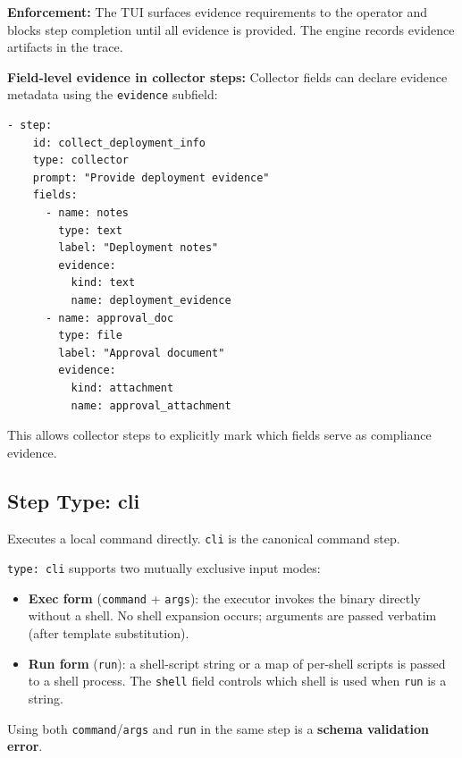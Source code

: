 \textbf{Enforcement:} The TUI surfaces evidence requirements to the operator and
blocks step completion until all evidence is provided.  The engine records evidence
artifacts in the trace.

\textbf{Field-level evidence in collector steps:}
Collector fields can declare evidence metadata using the \texttt{evidence} subfield:

\begin{verbatim}
- step:
    id: collect_deployment_info
    type: collector
    prompt: "Provide deployment evidence"
    fields:
      - name: notes
        type: text
        label: "Deployment notes"
        evidence:
          kind: text
          name: deployment_evidence
      - name: approval_doc
        type: file
        label: "Approval document"
        evidence:
          kind: attachment
          name: approval_attachment
\end{verbatim}

This allows collector steps to explicitly mark which fields serve as compliance evidence.

\subsection{Step Type: cli}
\label{subsec:step-cli}

Executes a local command directly.  \texttt{cli} is the
canonical command step.

\texttt{type: cli} supports two mutually exclusive input modes:

\begin{itemize}
  \item \textbf{Exec form} (\texttt{command} + \texttt{args}): the executor
        invokes the binary directly without a shell.  No shell expansion occurs;
        arguments are passed verbatim (after template substitution).
  \item \textbf{Run form} (\texttt{run}): a shell-script string or a map of
        per-shell scripts is passed to a shell process.  The \texttt{shell}
        field controls which shell is used when \texttt{run} is a string.
\end{itemize}

Using both \texttt{command}/\texttt{args} and \texttt{run} in the same step is
a \textbf{schema validation error}.

